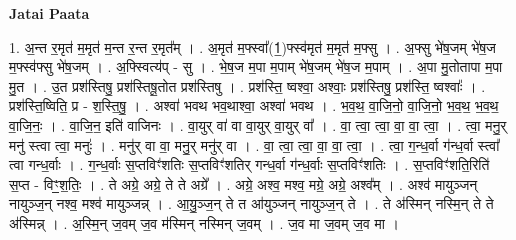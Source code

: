 \documentclass[17pt]{extarticle}
\begin{document}
\textbf{Jatai Paata} \newline

1. अ॒न्त र॒मृत॑ म॒मृत॑ म॒न्त र॒न्त र॒मृत᳚म् । . अ॒मृत॑ म॒फ्स्वा᳚(1॒)फ्स्व॑मृत॑ म॒मृत॑ म॒फ्सु । . अ॒फ्सु भे॑ष॒जम् भे॑ष॒ज म॒फ्स्व॑फ्सु भे॑ष॒जम् । . अ॒फ्स्वित्य॑प् - सु । . भे॒ष॒ज म॒पा म॒पाम् भे॑ष॒जम् भे॑ष॒ज म॒पाम् । . अ॒पा मु॒तोतापा म॒पा मु॒त । . उ॒त प्रश॑स्तिषु॒ प्रश॑स्तिषू॒तोत प्रश॑स्तिषु । . प्रश॑स्ति॒ ष्वश्वा॒ अश्वाः॒ प्रश॑स्तिषु॒ प्रश॑स्ति॒ ष्वश्वाः᳚ । . प्रश॑स्ति॒ष्विति॒ प्र - श॒स्ति॒षु॒ । . अश्वा॑ भवथ भव॒थाश्वा॒ अश्वा॑ भवथ । . भ॒व॒थ॒ वा॒जि॒नो॒ वा॒जि॒नो॒ भ॒व॒थ॒ भ॒व॒थ॒ वा॒जि॒नः॒ । . वा॒जि॒न॒ इति॑ वाजिनः । . वा॒युर् वा॑ वा वा॒युर् वा॒युर् वा᳚ । . वा॒ त्वा॒ त्वा॒ वा॒ वा॒ त्वा॒ । . त्वा॒ मनु॒र् मनु॑ स्त्वा त्वा॒ मनुः॑ । . मनु॑र् वा वा॒ मनु॒र् मनु॑र् वा । . वा॒ त्वा॒ त्वा॒ वा॒ वा॒ त्वा॒ । . त्वा॒ ग॒न्ध॒र्वा ग॑न्ध॒र्वा स्त्वा᳚ त्वा गन्ध॒र्वाः । . ग॒न्ध॒र्वाः स॒प्तविꣳ॑शतिः स॒प्तविꣳ॑शतिर् गन्ध॒र्वा ग॑न्ध॒र्वाः स॒प्तविꣳ॑शतिः । . स॒प्तविꣳ॑शति॒रिति॑ स॒प्त - विꣳ॒॒श॒तिः॒ । . ते अग्रे॒ अग्रे॒ ते ते अग्रे᳚ । . अग्रे॒ अश्व॒ मश्व॒ मग्रे॒ अग्रे॒ अश्व᳚म् । . अश्व॑ मायुञ्जन् नायुञ्ज॒न् नश्व॒ मश्व॑ मायुञ्जन्न् । . आ॒यु॒ञ्ज॒न् ते त आ॑युञ्जन् नायुञ्ज॒न् ते । . ते अ॑स्मिन् नस्मि॒न् ते ते अ॑स्मिन्न् । . अ॒स्मि॒न् ज॒वम् ज॒व म॑स्मिन् नस्मिन् ज॒वम् । . ज॒व मा ज॒वम् ज॒व मा । \newline
\end{document}
